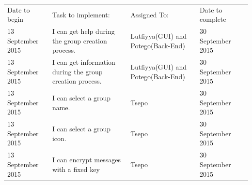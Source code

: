 \documentclass[a4paper]{article}
\begin{document}
\setlength{\arrayrulewidth}{0.5mm}
\setlength{\tabcolsep}{12pt}
\renewcommand{\arraystretch}{2} 
\begin{tabular}{ |p{3cm}|p{3cm}|p{3cm}|p{3cm}|p{3cm}|  }
\hline
\rowcolor{lightgray}\multicolumn{4}{|c|}{Work to Complete} \\
\hline 
Date to begin & Task to implement: & Assigned To: & Date to complete\\
\hline
13 September 2015 & I can get help during the group creation process. & Lutfiyya(GUI) and  Potego(Back-End) & 30 September 2015\\ 
\hline
13 September 2015 & I can get information during the group creation process. & Lutfiyya(GUI) and Potego(Back-End) & 30 September 2015\\ 
\hline
13 September 2015 & I can select a group name. & Tsepo  & 30 September 2015\\ 
\hline
13 September 2015 & I can select a group icon. & Tsepo  & 30 September 2015\\ 
\hline
13 September 2015 & I can encrypt messages with a fixed key & Tsepo  & 30 September 2015\\ 
\hline
\end{tabular}
\end{document}
